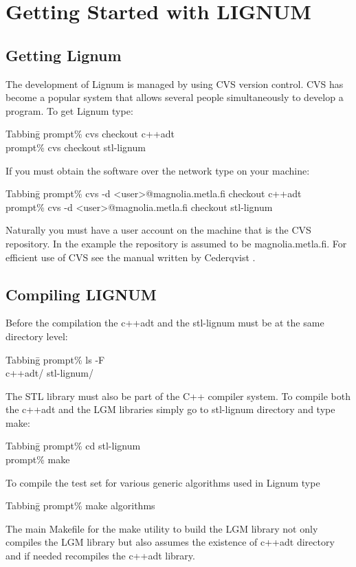 \chapter{Getting Started with LIGNUM}

\section{Getting Lignum}

The development of Lignum is managed by using CVS version control. CVS
has become a popular  system that allows several people simultaneously
to develop a program. To get Lignum type:
\begin{tabbing}
Tabbing\=\kill
\>prompt\% cvs checkout c++adt \\
\>prompt\% cvs checkout stl-lignum
\end{tabbing}
If you must obtain the software over the network type on your machine:
\begin{tabbing}
Tabbing\=\kill
\>prompt\% cvs -d <user>@magnolia.metla.fi checkout c++adt \\
\>prompt\% cvs -d <user>@magnolia.metla.fi checkout stl-lignum
\end{tabbing}
Naturally you must have a user  account on the machine that is the CVS
repository.   In   the  example  the  repository  is   assumed  to  be
magnolia.metla.fi. For efficient use of  CVS see the manual written by
Cederqvist \cite{Ced}.

\section{Compiling LIGNUM}

Before the compilation the c++adt and the stl-lignum must be at the
same directory level:
\begin{tabbing}
Tabbing\=\kill
\>prompt\% ls -F \\
\>c++adt/ stl-lignum/
\end{tabbing}
The STL  library must  also be  part of the  C++ compiler  system.  To
compile both the c++adt and  the LGM libraries simply go to stl-lignum
directory and type make:
\begin{tabbing}
Tabbing\=\kill
\>prompt\% cd stl-lignum \\
\>prompt\% make
\end{tabbing}
To compile the test set for various generic algorithms used in Lignum 
type
\begin{tabbing}
Tabbing\=\kill
\>prompt\% make algorithms
\end{tabbing} 
The main  Makefile for the make  utility to build the  LGM library not
only compiles the LGM library but also assumes the existence of c++adt
directory and if needed recompiles the c++adt library.

